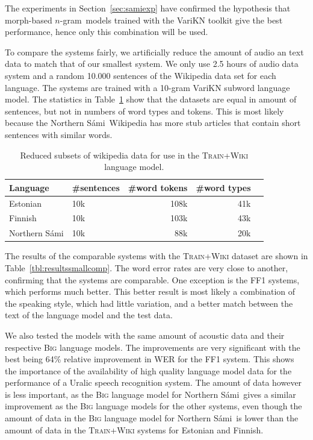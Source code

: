 \documentclass[b5paper]{article}
\newcommand{\ns}{Northern Sámi}
\newcommand{\ngram}{$n$-gram}
\newcommand{\ds}[1]{\textsc{#1}}
\begin{document}
The experiments in Section~\ref{sec:samiexp} have confirmed the hypothesis that morph-based \ngram\ models trained with the VariKN toolkit give the best performance, hence only this combination will be used.

To compare the systems fairly, we artificially reduce the amount of audio an text data to match that of our smallest system. We only use 2.5 hours of audio data system and a random 10.000 sentences of the Wikipedia data set for each language. The systems are trained with a 10-gram VariKN subword language model. The statistics in Table~\ref{tbl:lmdatacomp_small} show that the datasets are equal in amount of sentences, but not in numbers of word types and tokens. This is most likely because the \ns\ Wikipedia has more stub articles that contain short sentences with similar words.

\begin{table}
\centering
\begin{tabular}{llrrr}
\textbf{Language} & \textbf{\#sentences} & \textbf{\#word tokens} & \textbf{\#word types}\\\hline
Estonian &   10k & 108k & 41k \\
 Finnish &   10k  & 103k & 43k \\
 \ns &  10k & 88k & 20k\\
\end{tabular}
\caption{Reduced subsets of wikipedia data for use in the \ds{Train+Wiki} language model.\label{tbl:lmdatacomp_small}}
\end{table}

The results of the comparable systems with the \ds{Train+Wiki} dataset are shown in Table~\ref{tbl:resultssmallcomp}. The word error rates are very close to another, confirming that the systems are comparable. One exception is the FF1 systems, which performs much better. This better result is most likely a combination of the speaking style, which had little variation, and a better match between the text of the language model and the test data.

We also tested the models with the same amount of acoustic data and their respective \ds{Big} language models. The improvements are very significant with the best being 64\% relative improvement in WER for the FF1 system. This shows the importance of the availability of high quality language model data for the performance of a Uralic speech recognition system. The amount of data however is less important, as the \ds{Big} language model for \ns\ gives a similar improvement as the \ds{Big} language models for the other systems, even though the amount of data in the \ds{Big} language model for \ns\ is lower than the amount of data in the \ds{Train+Wiki} systems for Estonian and Finnish.
\end{document}
